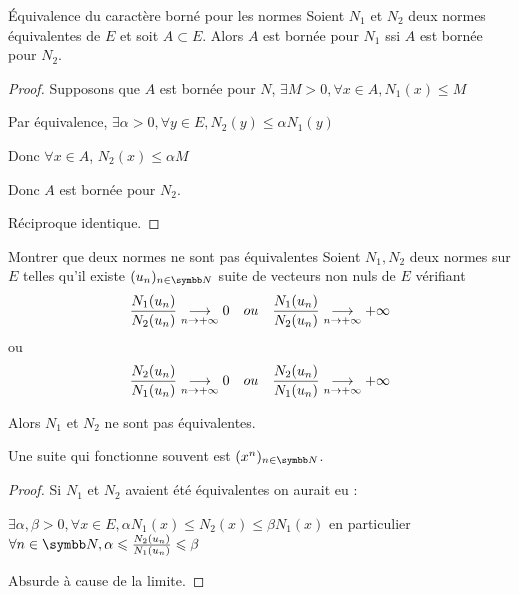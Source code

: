 \begin{proposition}{Équivalence du caractère borné pour les normes}{}
    Soient $N_1$ et $N_2$ deux normes équivalentes de $E$ et soit $A \subset E$. 
    Alors $A$ est bornée pour $N_1$ ssi $A$ est bornée pour $N_2$.
\end{proposition}


\begin{proof}
    Supposons que $A$ est bornée pour $N$, $\exists M > 0, \forall x \in A, N_1(x) \leqslant M$

    Par équivalence, $\exists \alpha > 0, \forall y \in E, N_2(y) \leqslant \alpha N_1(y)$

    Donc $\forall x \in A$, $N_2(x) \leqslant \alpha M$

    Donc $A$ est bornée pour $N_2$.

    Réciproque identique.
\end{proof}

\begin{proposition}{Montrer que deux normes ne sont pas équivalentes}{}
    Soient $N_1, N_2$ deux normes sur $E$ telles qu'il existe $(u_n)_{n \in \N}$ suite
    de vecteurs non nuls de $E$ vérifiant 
    \[\frac{N_1(u_n )}{N_2(u_n )} \underset{n \to + \infty}{\longrightarrow} 0 \quad ou \quad \frac{N_1(u_n )}{N_2(u_n )} \underset{n \to + \infty}{\longrightarrow} + \infty\]
    ou
    \[\frac{N_2(u_n )}{N_1(u_n )} \underset{n \to + \infty}{\longrightarrow} 0 \quad ou \quad \frac{N_2(u_n )}{N_1(u_n )} \underset{n \to + \infty}{\longrightarrow} + \infty\]

    Alors $N_1$ et $N_2$ ne sont pas équivalentes.
\end{proposition}

\begin{remarque}
    Une suite qui fonctionne souvent est $(x^n)_{n \in \N}$.
\end{remarque}


\begin{proof}
    Si $N_1$ et $N_2$ avaient été équivalentes on aurait eu :
    
    $\exists \alpha, \beta > 0, \forall x \in E, \alpha N_1(x) \leqslant N_2(x) \leqslant \beta N_1(x)$
    en particulier $\forall n \in \N, \alpha \leqslant \frac{N_2(u_n)}{N_1(u_n)} \leqslant \beta$

    Absurde à cause de la limite.
\end{proof}

